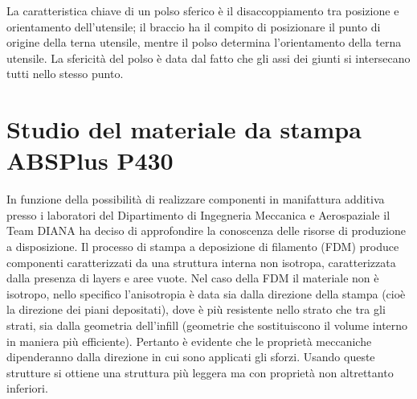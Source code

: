 \documentclass[%
corpo=11pt,
twoside,
 stile=classica,
oldstyle,
greek,%
]{toptesi}
\begin{document}
	La caratteristica chiave di un polso sferico è il disaccoppiamento tra posizione e orientamento dell'utensile; il braccio ha il compito di posizionare il punto di origine della terna utensile, mentre il polso determina l'orientamento della terna utensile.
	La sfericità del polso è data dal fatto che gli assi dei giunti si intersecano tutti nello stesso punto.
	
	
	\section{Studio del materiale da stampa ABSPlus P430}
	In funzione della possibilità di realizzare componenti in manifattura additiva presso i laboratori  del Dipartimento di Ingegneria Meccanica e Aerospaziale il Team DIANA ha deciso di approfondire la conoscenza delle risorse di produzione a disposizione. 
	Il processo di stampa a deposizione di filamento (FDM) produce componenti caratterizzati da una struttura interna non isotropa, caratterizzata dalla presenza di layers e aree vuote. Nel caso della FDM il materiale non è isotropo, nello specifico l’anisotropia è data sia dalla direzione della stampa (cioè la direzione dei piani depositati), dove è più resistente nello strato che tra gli strati, sia dalla geometria dell’infill (geometrie che sostituiscono il volume interno in maniera più efficiente).
	 Pertanto è evidente che le proprietà meccaniche dipenderanno dalla direzione in cui sono applicati gli sforzi. 
	 Usando queste strutture si ottiene una struttura più leggera ma con proprietà non altrettanto inferiori. 
	 
\end{document}
